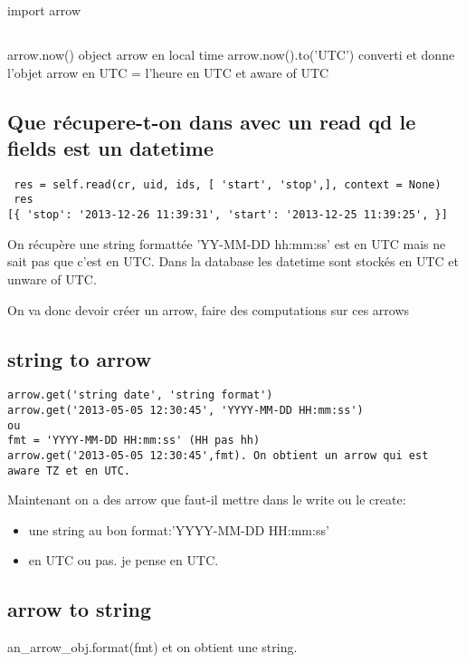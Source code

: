 \documentclass[12pt,a4paper]{article}
\begin{document}
import arrow

\subsection{}
arrow.now() object arrow en local time
arrow.now().to('UTC') converti et donne l'objet arrow en UTC = l'heure en UTC et aware of UTC


\subsection{Que récupere-t-on dans avec un read qd le fields est un datetime}
\label{sec:datetime}


\begin{verbatim}
 res = self.read(cr, uid, ids, [ 'start', 'stop',], context = None)
 res
[{ 'stop': '2013-12-26 11:39:31', 'start': '2013-12-25 11:39:25', }]
\end{verbatim}


On récupère une string formattée 'YY-MM-DD hh:mm:ss' est en UTC mais ne sait pas que c'est en UTC.
Dans la database les datetime sont stockés en UTC et unware of UTC.

On va donc devoir créer un arrow, faire des computations sur ces arrows

\subsection{string to arrow}
\label{sec:string2arrow}
\begin{verbatim}
arrow.get('string date', 'string format')
arrow.get('2013-05-05 12:30:45', 'YYYY-MM-DD HH:mm:ss')
ou
fmt = 'YYYY-MM-DD HH:mm:ss' (HH pas hh)
arrow.get('2013-05-05 12:30:45',fmt). On obtient un arrow qui est aware TZ et en UTC.
\end{verbatim}

Maintenant on a des arrow que faut-il mettre dans le write ou le create:
\begin{itemize}
\item une string au bon format:'YYYY-MM-DD HH:mm:ss'
\item en UTC ou pas. je pense en UTC. 
\end{itemize}


\subsection{arrow to string}
\label{sec:arrow2string}

an\_arrow\_obj.format(fmt) et on obtient une string.
\end{document}
